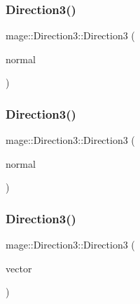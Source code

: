 \hypertarget{structmage_1_1_direction3_a18282959c79c93d25488d72f944495e3}{}\label{structmage_1_1_direction3_a18282959c79c93d25488d72f944495e3} 
\subsubsection{\texorpdfstring{Direction3()}{Direction3()}\hspace{0.1cm}{\footnotesize\ttfamily [7/10]}}
{\footnotesize\ttfamily mage\+::\+Direction3\+::\+Direction3 (\begin{DoxyParamCaption}\item[{const \hyperlink{structmage_1_1_normal3}{Normal3} \&}]{normal }\end{DoxyParamCaption})}

\hypertarget{structmage_1_1_direction3_a1449bce28e2956adb85f015adfbb1c0d}{}\label{structmage_1_1_direction3_a1449bce28e2956adb85f015adfbb1c0d} 
\subsubsection{\texorpdfstring{Direction3()}{Direction3()}\hspace{0.1cm}{\footnotesize\ttfamily [8/10]}}
{\footnotesize\ttfamily mage\+::\+Direction3\+::\+Direction3 (\begin{DoxyParamCaption}\item[{\hyperlink{structmage_1_1_normal3}{Normal3} \&\&}]{normal }\end{DoxyParamCaption})}

\hypertarget{structmage_1_1_direction3_afb66ddfb4489dd7c0bfc25c29b97df9c}{}\label{structmage_1_1_direction3_afb66ddfb4489dd7c0bfc25c29b97df9c} 
\subsubsection{\texorpdfstring{Direction3()}{Direction3()}\hspace{0.1cm}{\footnotesize\ttfamily [9/10]}}
{\footnotesize\ttfamily mage\+::\+Direction3\+::\+Direction3 (\begin{DoxyParamCaption}\item[{const X\+M\+F\+L\+O\+A\+T3 \&}]{vector }\end{DoxyParamCaption})\hspace{0.3cm}{\ttfamily [explicit]}}

